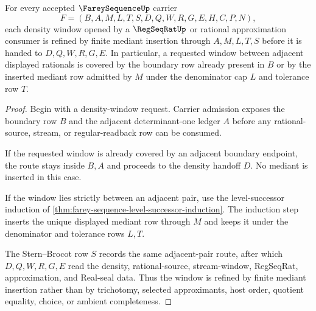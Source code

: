 \begin{theorem}
\label{thm:farey-sequence-mediant-density-window}
For every accepted $\FareySequenceUp$ carrier
$$
F=(B,A,M,L,T,S,D,Q,W,R,G,E,H,C,P,N),
$$
each density window opened by a $\RegSeqRatUp$ or rational approximation consumer is refined by finite mediant insertion through $A,M,L,T,S$ before it is handed to $D,Q,W,R,G,E$. In particular, a requested window between adjacent displayed rationals is covered by the boundary row already present in $B$ or by the inserted mediant row admitted by $M$ under the denominator cap $L$ and tolerance row $T$.
\end{theorem}
\begin{proof}
Begin with a density-window request. Carrier admission exposes the boundary row $B$ and the adjacent determinant-one ledger $A$ before any rational-source, stream, or regular-readback row can be consumed.

If the requested window is already covered by an adjacent boundary endpoint, the route stays inside $B,A$ and proceeds to the density handoff $D$. No mediant is inserted in this case.

If the window lies strictly between an adjacent pair, use the level-successor induction of \autoref{thm:farey-sequence-level-successor-induction}. The induction step inserts the unique displayed mediant row through $M$ and keeps it under the denominator and tolerance rows $L,T$.

The Stern--Brocot row $S$ records the same adjacent-pair route, after which $D,Q,W,R,G,E$ read the density, rational-source, stream-window, RegSeqRat, approximation, and Real-seal data. Thus the window is refined by finite mediant insertion rather than by trichotomy, selected approximants, host order, quotient equality, choice, or ambient completeness.
\end{proof}

